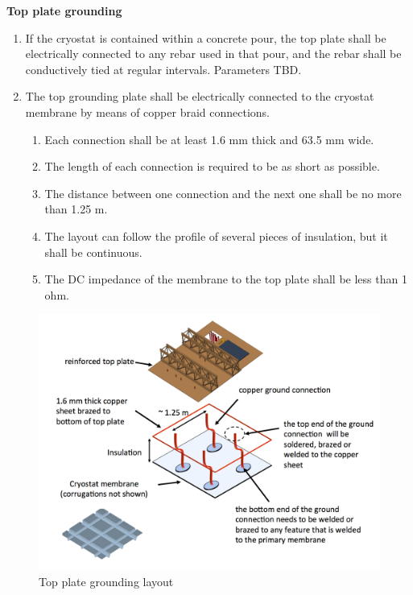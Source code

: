 \textbf{Top plate grounding}
\begin{enumerate}
\item If the cryostat is contained within a concrete pour, the top plate shall be electrically connected to any rebar used in that pour, and the rebar shall be conductively tied at regular intervals. Parameters TBD.
\item The top grounding plate shall be electrically connected to the cryostat membrane by means of copper braid connections.
   \begin{enumerate}
   \item Each connection shall be at least 1.6 mm thick and 63.5 mm wide.
   \item The length of each connection is required to be as short as possible.
   \item The distance between one connection and the next one shall be no more than 1.25 m.
   \item The layout can follow the profile of several pieces of insulation, but it shall be continuous.
   \item The DC impedance of the membrane to the top plate shall be less than 1 ohm.
   \end{enumerate}
\end{enumerate}

\begin{figure}
\begin{center}
\includegraphics[width=.95\textwidth]{figures/cryostat-top-plate-gnd} 
\caption[Top plate grounding layout]{\label{fig:top-plate-gnd}Top plate grounding layout}
\end{center}
\end{figure}

